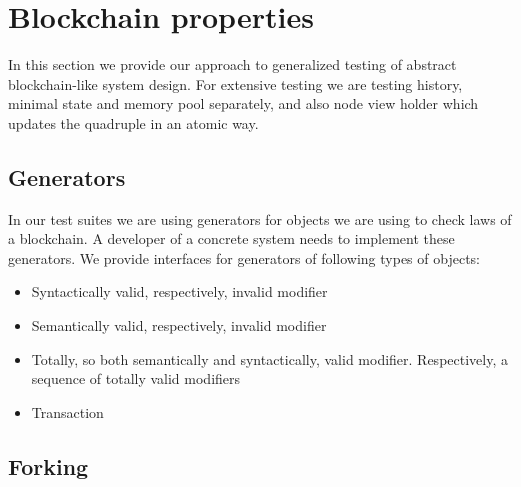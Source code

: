 
\section{Blockchain properties}

In this section we provide our approach to generalized testing of abstract blockchain-like system design. For extensive testing we are  testing history, minimal state and memory pool separately, and also node view holder which updates the quadruple {\em <history, minimal state, vault, memory pool>} in an atomic way.


\subsection{Generators}

In our test suites we are using generators for objects we are using to check laws of a blockchain. A developer of a concrete system needs to implement these generators. We provide interfaces for generators of following types of objects:

\begin{itemize}
	\item{Syntactically valid, respectively, invalid modifier}
	\item{Semantically valid, respectively, invalid modifier}
	\item{Totally, so both semantically and syntactically, valid modifier. Respectively, a sequence of totally valid modifiers}
	\item{Transaction}
\end{itemize}

\subsection{Forking}


